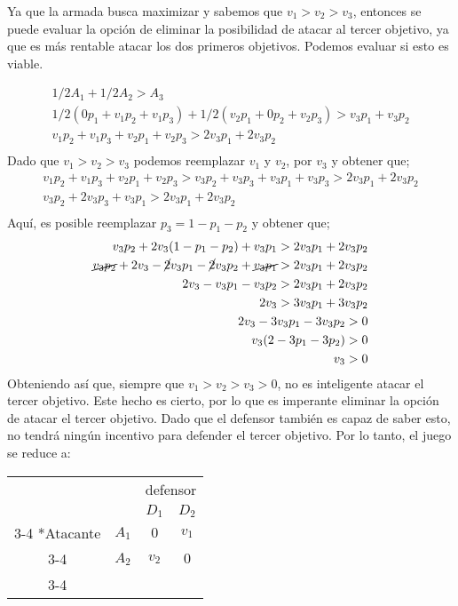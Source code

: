 \documentclass[12pt]{article}
\begin{document}
    \begin{flushleft}
        Ya que la armada busca maximizar y sabemos que $v_1>v_2>v_3$, entonces se puede evaluar la opción de eliminar la posibilidad de atacar al tercer objetivo, ya que es más rentable atacar los dos primeros objetivos. Podemos evaluar si esto es viable.
    
        \begin{align*}
            1/2A_1+1/2A_2>A_3\\
            1/2(0p_1+v_1p_2+v_1p_3)+1/2(v_2p_1+0p_2+v_2p_3)>v_3p_1+v_3p_2\\
            v_1p_2+v_1p_3+v_2p_1+v_2p_3>2v_3p_1+2v_3p_2\\
        \end{align*}
        Dado que $v_1>v_2>v_3$ podemos reemplazar $v_1$ y $v_2$, por $v_3$ y obtener que;
        \begin{align*}
            v_1p_2+v_1p_3+v_2p_1+v_2p_3>v_3p_2+v_3p_3+v_3p_1+v_3p_3>2v_3p_1+2v_3p_2\\
            v_3p_2+2v_3p_3+v_3p_1>2v_3p_1+2v_3p_2\\
        \end{align*}
        Aquí, es posible reemplazar $p_3=1-p_1-p_2$ y obtener que;
        \begin{align*}
            v_3p_2+2v_3(1-p_1-p_2)+v_3p_1>2v_3p_1+2v_3p_2\\
            \cancel{v_3p_2}+2v_3-\cancel{2}v_3p_1-\cancel{2}v_3p_2+\cancel{v_3p_1}>2v_3p_1+2v_3p_2\\
            2v_3-v_3p_1-v_3p_2>2v_3p_1+2v_3p_2\\
            2v_3>3v_3p_1+3v_3p_2\\
            2v_3-3v_3p_1-3v_3p_2>0\\
            v_3(2-3p_1-3p_2)>0\\
            v_3>0\\
        \end{align*}
        Obteniendo así que, siempre que $v_1 > v_2 > v_3 > 0$, no es inteligente atacar el tercer objetivo. Este hecho es cierto, por lo que es imperante eliminar la opción de atacar el tercer objetivo. Dado que el defensor también es capaz de saber esto, no tendrá ningún incentivo para defender el tercer objetivo. Por lo tanto, el juego se reduce a:
    \end{flushleft}
    \begin{center}    
        \setlength{\extrarowheight}{0pt}
        \begin{tabular}{cc|c|c|}
            & \multicolumn{1}{c}{} & \multicolumn{2}{c}{defensor}\\
            & \multicolumn{1}{c}{} & \multicolumn{1}{c}{$D_1$}  & \multicolumn{1}{c}{$D_2$}\\\cline{3-4}
            \multirow{2}*{Atacante} & $A_1$ & $0$ & $v_1$ \\\cline{3-4}
            & $A_2$ & $v_2$ & $0$\\\cline{3-4}
        \end{tabular}
    \end{center}
\end{document}
